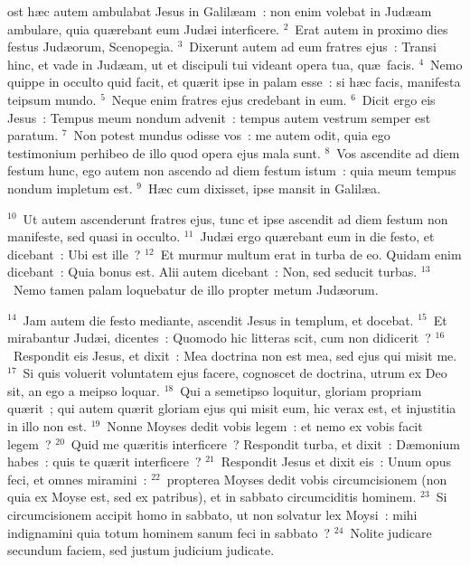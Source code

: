 \bchapter
{}ost h\ae c autem ambulabat Jesus in Galil\ae am~: non enim volebat in Jud\ae am ambulare, quia qu\ae rebant eum Jud\ae i interficere.
${}^{2}$~Erat autem in proximo dies festus Jud\ae orum, Scenopegia.
${}^{3}$~Dixerunt autem ad eum fratres ejus~: Transi hinc, et vade in Jud\ae am, ut et discipuli tui videant opera tua, qu\ae\ facis.
${}^{4}$~Nemo quippe in occulto quid facit, et qu\ae rit ipse in palam esse~: si h\ae c facis, manifesta teipsum mundo.
${}^{5}$~Neque enim fratres ejus credebant in eum.
${}^{6}$~Dicit ergo eis Jesus~: Tempus meum nondum advenit~: tempus autem vestrum semper est paratum.
${}^{7}$~Non potest mundus odisse vos~: me autem odit, quia ego testimonium perhibeo de illo quod opera ejus mala sunt.
${}^{8}$~Vos ascendite ad diem festum hunc, ego autem non ascendo ad diem festum istum~: quia meum tempus nondum impletum est.
${}^{9}$~H\ae c cum dixisset, ipse mansit in Galil\ae a.


${}^{10}$~Ut autem ascenderunt fratres ejus, tunc et ipse ascendit ad diem festum non manifeste, sed quasi in occulto.
${}^{11}$~Jud\ae i ergo qu\ae rebant eum in die festo, et dicebant~: Ubi est ille~?
${}^{12}$~Et murmur multum erat in turba de eo. Quidam enim dicebant~: Quia bonus est. Alii autem dicebant~: Non, sed seducit turbas.
${}^{13}$~Nemo tamen palam loquebatur de illo propter metum Jud\ae orum.


${}^{14}$~Jam autem die festo mediante, ascendit Jesus in templum, et docebat.
${}^{15}$~Et mirabantur Jud\ae i, dicentes~: Quomodo hic litteras scit, cum non didicerit~?
${}^{16}$~Respondit eis Jesus, et dixit~: Mea doctrina non est mea, sed ejus qui misit me.
${}^{17}$~Si quis voluerit voluntatem ejus facere, cognoscet de doctrina, utrum ex Deo sit, an ego a meipso loquar.
${}^{18}$~Qui a semetipso loquitur, gloriam propriam qu\ae rit~; qui autem qu\ae rit gloriam ejus qui misit eum, hic verax est, et injustitia in illo non est.
${}^{19}$~Nonne Moyses dedit vobis legem~: et nemo ex vobis facit legem~?
${}^{20}$~Quid me qu\ae ritis interficere~? Respondit turba, et dixit~: D\ae monium habes~: quis te qu\ae rit interficere~?
${}^{21}$~Respondit Jesus et dixit eis~: Unum opus feci, et omnes miramini~:
${}^{22}$~propterea Moyses dedit vobis circumcisionem (non quia ex Moyse est, sed ex patribus), et in sabbato circumciditis hominem.
${}^{23}$~Si circumcisionem accipit homo in sabbato, ut non solvatur lex Moysi~: mihi indignamini quia totum hominem sanum feci in sabbato~?
${}^{24}$~Nolite judicare secundum faciem, sed justum judicium judicate.


